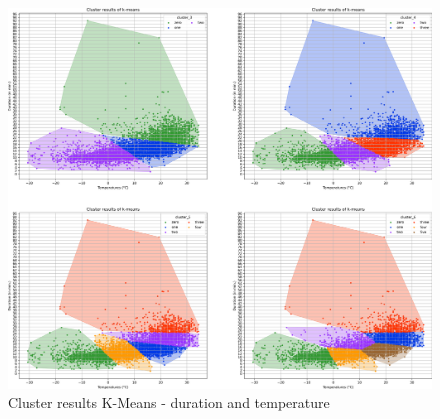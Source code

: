 \begin{figure}[H]
   \centering
    \includegraphics[width=1\linewidth]{./Figures/Cluster_KMEANS_Duration_Temp.png}
    \caption{Cluster results K-Means - duration and temperature}
    \label{Cluster_KMEANS_Duration_Temp}
\end{figure}

